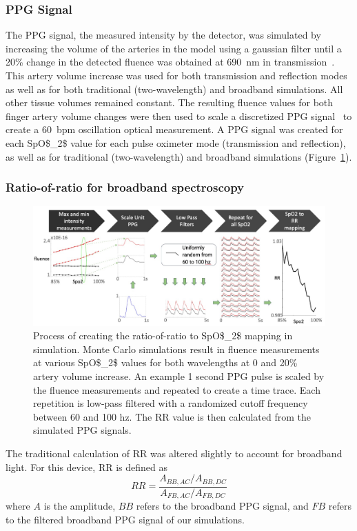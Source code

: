 \subsubsection{PPG Signal}
The \ac{PPG} signal, the measured intensity by the detector, was simulated by increasing the volume of the arteries in the model using a gaussian filter until a 20\% change in the detected fluence was obtained at 690~nm in transmission~\cite{Hertzman1938}. This artery volume increase was used for both transmission and reflection modes as well as for both traditional (two-wavelength) and broadband simulations. All other tissue volumes remained constant. The resulting fluence values for both finger artery volume changes were then used to scale a discretized \ac{PPG} signal~\cite{Elgendi2012} to create a 60~bpm oscillation optical measurement. A \ac{PPG} signal was created for each \ac{SpO$_2$} value for each pulse oximeter mode (transmission and reflection), as well as for traditional (two-wavelength) and broadband simulations (Figure~\ref{fig:D3process}). 
        
\subsubsection{Ratio-of-ratio for broadband spectroscopy}
\begin{figure}
    \begin{center}
    \includegraphics[width=\textwidth]{fig/moxi/D3process.pdf}
    \end{center}
    \caption{Process of creating the ratio-of-ratio to \ac{SpO$_2$} mapping in simulation. Monte Carlo simulations result in fluence measurements at various \ac{SpO$_2$} values for both wavelengths at 0 and 20\% artery volume increase. An example 1 second \ac{PPG} pulse is scaled by the fluence measurements and repeated to create a time trace. Each repetition is low-pass filtered with a randomized cutoff frequency between 60 and 100 hz. The \ac{RR} value is then calculated from the simulated \ac{PPG} signals.} 
    \label{fig:D3process}
\end{figure} 
The traditional calculation of \ac{RR} was altered slightly to account for broadband light. For this device, \ac{RR} is defined as 
\begin{equation} \label{eq:RRbroadband}
    RR = \frac{ A_{BB,AC}/A_{BB,DC} }{ A_{FB,AC}/A_{FB,DC} }
\end{equation}
where $A$ is the amplitude, $BB$ refers to the broadband \ac{PPG} signal, and $FB$ refers to the filtered broadband \ac{PPG} signal of our simulations. 
        
